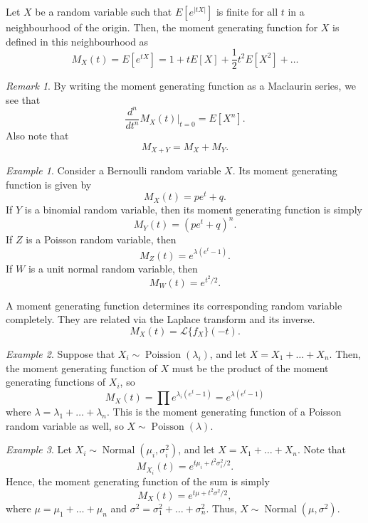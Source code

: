 \documentclass[11pt]{article}
\newcommand\dd[3][]{\frac{d^{#1}{#2}}{d {#3}^{#1}}}
\newcommand\E[1]{E\left[#1\right]}
\theoremstyle{definition}
\theoremstyle{remark}
\newtheorem*{remark}{Remark}
\newtheorem*{example}{Example}
\numberwithin{equation}{module}
\begin{document}
    \begin{definition}
        Let $X$ be a random variable such that $\E{e^{|tX|}}$ is finite for all $t$ 
        in a neighbourhood of the origin. Then, the moment generating function for
        $X$ is defined in this neighbourhood as \[
            M_X(t) = \E{e^{tX}} = 1 + t\E{X} + \frac{1}{2}t^2\E{X^2} + \dots
        \] 
        \begin{remark}
            By writing the moment generating function as a Maclaurin series, we see
            that \[
                \dd[n]{}{t}M_X(t)\Big|_{t = 0} = \E{X^n}.
            \] Also note that \[
                M_{X + Y} = M_X + M_Y.
            \] 
        \end{remark}
    \end{definition}
    \begin{example}
        Consider a Bernoulli random variable $X$. Its moment generating function is
        given by \[
            M_X(t) = pe^t + q.
        \] If $Y$ is a binomial random variable, then its moment generating function
        is simply \[
            M_Y(t) = (pe^t + q)^n.
        \] If $Z$ is a Poisson random variable, then \[
            M_Z(t) = e^{\lambda(e^t - 1)}.
        \] If $W$ is a unit normal random variable, then \[
            M_W(t) = e^{t^2 / 2}.
        \] 
    \end{example}

    \begin{theorem}
        A moment generating function determines its corresponding random variable
        completely. They are related via the Laplace transform and its inverse. \[
            M_X(t) = \mathcal{L}\{f_X\}(-t).
        \] 
    \end{theorem}
    \begin{example}
        Suppose that $X_i \sim \operatorname{Poission}(\lambda_i)$, and let $X = X_1
        + \dots + X_n$. Then, the moment generating function of $X$ must be the
        product of the moment generating functions of $X_i$, so \[
            M_X(t) = \prod e^{\lambda_i(e^t - 1)} = e^{\lambda(e^t - 1)}
        \] where $\lambda = \lambda_1 + \dots + \lambda_n$. This is the moment
        generating function of a Poisson random variable as well, so $X \sim
        \operatorname{Poisson}(\lambda)$.
    \end{example}
    \begin{example}
        Let $X_i \sim \operatorname{Normal}(\mu_i, \sigma_i^2)$, and let $X = X_1 +
        \dots + X_n$. Note that \[
            M_{X_i}(t) = e^{t\mu_i + t^2\sigma_i^2 / 2}.
        \] Hence, the moment generating function of the sum is simply \[
            M_X(t) = e^{t\mu + t^2\sigma^2 / 2},
        \] where $\mu = \mu_1 + \dots + \mu_n$ and $\sigma^2 = \sigma_1^2 + \dots +
        \sigma_n^2$. Thus, $X \sim \operatorname{Normal}(\mu, \sigma^2)$.
    \end{example}
\end{document}
